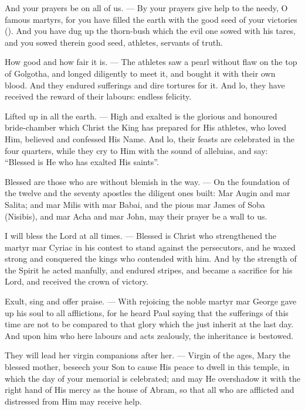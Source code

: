 \documentclass[12pt,twoside,a5paper]{article}
\begin{document}
\begin{halfparskip}
  And your prayers be on all of us. --- By your prayers give help to the needy, O famous martyrs, for you have filled the earth with the good seed of your victories (). And you have dug up the thorn-bush which the evil one sowed with his tares, and you sowed therein good seed, athletes, servants of truth.

  How good and how fair it is. --- The athletes saw a pearl without flaw on the top of Golgotha, and longed diligently to meet it, and bought it with their own blood. And they endured sufferings and dire tortures for it. And lo, they have received the reward of their labours: endless felicity.

  Lifted up in all the earth. --- High and exalted is the glorious and honoured bride-chamber which Christ the King has prepared for His athletes, who loved Him, believed and confessed His Name. And lo, their feasts are celebrated in the four quarters, while they cry to Him with the sound of alleluias, and say: ``Blessed is He who has exalted His saints''.

  Blessed are those who are without blemish in the way. --- On the foundation of the twelve and the seventy apostles the diligent ones built: Mar Augin and mar Salita; and mar Milis with mar Babai, and the pious mar James of Soba (Nisibis), and mar Acha and mar John, may their prayer be a wall to us.

  I will bless the Lord at all times. --- Blessed is Christ who strengthened the martyr mar Cyriac in his contest to stand against the persecutors, and he waxed strong and conquered the kings who contended with him. And by the strength of the Spirit he acted manfully, and endured stripes, and became a sacrifice for his Lord, and received the crown of victory.

  Exult, sing and offer praise. --- With rejoicing the noble martyr mar George gave up his soul to all afflictions, for he heard Paul saying that the sufferings of this time are not to be compared to that glory which the just inherit at the last day. And upon him who here labours and acts zealously, the inheritance is bestowed.

  They will lead her virgin companions after her. --- Virgin of the ages, Mary the blessed mother, beseech your Son to cause His peace to dwell in this temple, in which the day of your memorial is celebrated; and may He overshadow it with the right hand of His mercy as the house of Abram, so that all who are afflicted and distressed from Him may receive help.


\end{halfparskip}
\end{document}
